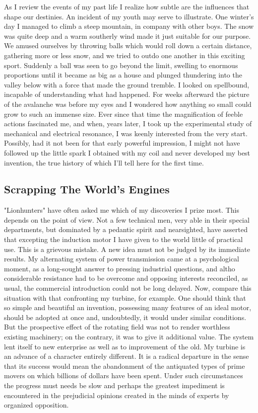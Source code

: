 \documentclass[a4paper,12pt,english,twoside,openright]{memoir}
\begin{document}
As I review the events of my past life I realize how subtle are the influences that shape our 
destinies.  An incident of my youth may serve to illustrate.  One winter's day I managed to climb a 
steep mountain, in company with other boys.  The snow was quite deep and a warm southerly 
wind made it just suitable for our purpose.  We amused ourselves by throwing balls which would 
roll down a certain distance, gathering more or less snow, and we tried to outdo one another in 
this exciting sport.  Suddenly a ball was seen to go beyond the limit, swelling to enormous 
proportions until it became as big as a house and plunged thundering into the valley below with a 
force that made the ground tremble.  I looked on spellbound, incapable of understanding what 
had happened.  For weeks afterward the picture of the avalanche was before my eyes and I 
wondered how anything so small could grow to such an immense size.  Ever since that time the 
magnification of feeble actions fascinated me, and when, years later, I took up the experimental 
study of mechanical and electrical resonance, I was keenly interested from the very start.  
Possibly, had it not been for that early powerful impression, I might not have followed up the little 
spark I obtained with my coil and never developed my best invention, the true history of which I'll 
tell here for the first time.  

\subsection{Scrapping The World's Engines}
"Lionhunters" have often asked me which of my discoveries I prize most.  This depends on the 
point of view.  Not a few technical men, very able in their special departments, but dominated by 
a pedantic spirit and nearsighted, have asserted that excepting the induction motor I have given 
to the world little of practical use.  This is a grievous mistake.  A new idea must not be judged by 
its immediate results.  My alternating system of power transmission came at a psychological 
moment, as a long-sought answer to pressing industrial questions, and altho considerable 
resistance had to be overcome and opposing interests reconciled, as usual, the commercial 
introduction could not be long delayed.  Now, compare this situation with that confronting my 
turbine, for example.  One should think that so simple and beautiful an invention, possessing 
many features of an ideal motor, should be adopted at once and, undoubtedly, it would under 
similar conditions.  But the prospective effect of the rotating field was not to render worthless 
existing machinery; on the contrary, it was to give it additional value.  The system lent itself to 
new enterprise as well as to improvement of the old.  My turbine is an advance of a character 
entirely different.  It is a radical departure in the sense that its success would mean the 
abandonment of the antiquated types of prime movers on which billions of dollars have been 
spent.  Under such circumstances the progress must needs be slow and perhaps the greatest 
impediment is encountered in the prejudicial opinions created in the minds of experts by 
organized opposition.  
\end{document}
